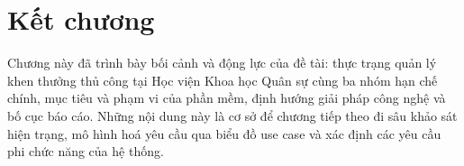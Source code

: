 \documentclass[../DoAn.tex]{subfiles}
\begin{document}
\section*{Kết chương}

Chương này đã trình bày bối cảnh và động lực của đề tài: thực trạng quản lý khen thưởng thủ công tại Học viện Khoa học Quân sự cùng ba nhóm hạn chế chính, mục tiêu và phạm vi của phần mềm, định hướng giải pháp công nghệ và bố cục báo cáo. Những nội dung này là cơ sở để chương tiếp theo đi sâu khảo sát hiện trạng, mô hình hoá yêu cầu qua biểu đồ use case và xác định các yêu cầu phi chức năng của hệ thống.
\end{document}
